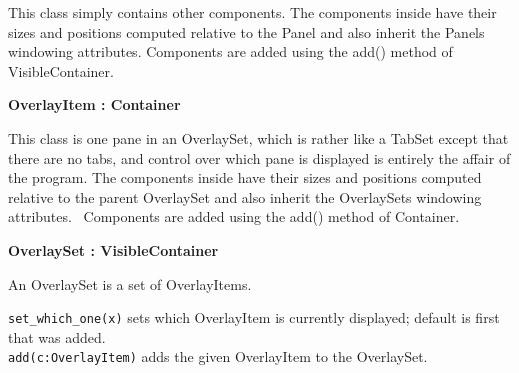 This class simply contains other components. The components inside have
their sizes and positions computed relative to the Panel and also
inherit the Panel{\textquotesingle}s windowing attributes. Components
are added using the add() method of VisibleContainer.

{\ttfamily\bfseries
{}OverlayItem : Container}

This class is one {\textquotedbl}pane{\textquotedbl} in an OverlaySet,
which is rather like a TabSet except that there are no tabs, and
control over which pane is displayed is entirely the affair of the
program. The components inside have their sizes and positions computed
relative to the parent OverlaySet and also inherit the
OverlaySet{\textquotesingle}s windowing attributes. \ Components are
added using the add() method of Container.

{\ttfamily\bfseries
{}OverlaySet : VisibleContainer}

An OverlaySet is a set of OverlayItems.

\texttt{set\_which\_one(x)} sets which OverlayItem is currently displayed;
default is first that was added.\\
\texttt{add(c:OverlayItem)} adds the given OverlayItem to the OverlaySet.
